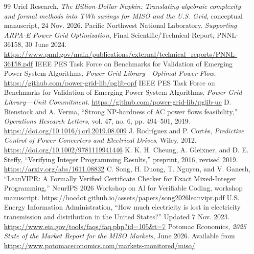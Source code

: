 \documentclass[11pt,letterpaper]{article}
\begin{document}
\begin{thebibliography}{99}
 Uriel Research, \emph{The Billion-Dollar Napkin: Translating algebraic complexity and formal methods into TWh savings for MISO and the U.S. Grid}, conceptual manuscript, 24 Nov. 2026.
 Pacific Northwest National Laboratory, \emph{Supporting ARPA-E Power Grid Optimization}, Final Scientific/Technical Report, PNNL-36158, 30 June 2024. \url{https://www.pnnl.gov/main/publications/external/technical_reports/PNNL-36158.pdf}
 IEEE PES Task Force on Benchmarks for Validation of Emerging Power System Algorithms, \emph{Power Grid Library---Optimal Power Flow}. \url{https://github.com/power-grid-lib/pglib-opf}
 IEEE PES Task Force on Benchmarks for Validation of Emerging Power System Algorithms, \emph{Power Grid Library---Unit Commitment}. \url{https://github.com/power-grid-lib/pglib-uc}
 D. Bienstock and A. Verma, ``Strong NP-hardness of AC power flows feasibility,'' \emph{Operations Research Letters}, vol. 47, no. 6, pp. 494--501, 2019. \url{https://doi.org/10.1016/j.orl.2019.08.009}
 J. Rodr\'iguez and P. Cort\'es, \emph{Predictive Control of Power Converters and Electrical Drives}, Wiley, 2012. \url{https://doi.org/10.1002/9781119941446}
 K. K. H. Cheung, A. Gleixner, and D. E. Steffy, ``Verifying Integer Programming Results,'' preprint, 2016, revised 2019. \url{https://arxiv.org/abs/1611.08832}
 C. Song, H. Duong, T. Nguyen, and V. Ganesh, ``LeanVIPR: A Formally Verified Certificate Checker for Exact Mixed-Integer Programming,'' NeurIPS 2026 Workshop on AI for Verifiable Coding, workshop manuscript. \url{https://hocdot.github.io/assets/papers/song2026leanvipr.pdf}
 U.S. Energy Information Administration, ``How much electricity is lost in electricity transmission and distribution in the United States?'' Updated 7 Nov. 2023. \url{https://www.eia.gov/tools/faqs/faq.php?id=105&t=7}
 Potomac Economics, \emph{2025 State of the Market Report for the MISO Markets}, June 2026. Available from \url{https://www.potomaceconomics.com/markets-monitored/miso/}
\end{thebibliography}
\end{document}
